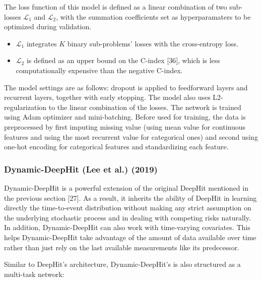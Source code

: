 \documentclass[
]{article}
\providecommand{\tightlist}{%
  \setlength{\itemsep}{0pt}\setlength{\parskip}{0pt}}
\begin{document}
The loss function of this model is defined as a linear combination of two sub-losses \(\mathcal{L}_1\) and \(\mathcal{L}_2\), with the summation coefficients set as hyperparamaters to be optimized during validation.
\vspace{-0.5cm}

\begin{itemize}
\tightlist
\item
  \(\mathcal{L}_1\) integrates \(K\) binary sub-problems' losses with the cross-entropy loss.
\item
  \(\mathcal{L}_2\) is defined as an upper bound on the C-index {[}36{]}, which is less computationally expensive than the negative C-index.
\end{itemize}

The model settings are as follows: dropout is applied to feedforward layers and recurrent layers, together with early stopping. The model also uses L2-regularization to the linear combination of the losses. The network is trained using Adam optimizer and mini-batching. Before used for training, the data is preprocessed by first imputing missing value (using mean value for continuous features and using the most recurrent value for categorical ones) and second using one-hot encoding for categorical features and standardizing each feature.

\hypertarget{dynamic-deephit-lee-et-al.-2019}{%
\subsubsection{Dynamic-DeepHit (Lee et al.) (2019)}\label{dynamic-deephit-lee-et-al.-2019}}

Dynamic-DeepHit is a powerful extension of the original DeepHit mentioned in the previous section {[}27{]}. As a result, it inherits the ability of DeepHit in learning directly the time-to-event distribution without making any strict assumption on the underlying stochastic process and in dealing with competing risks naturally. In addition, Dynamic-DeepHit can also work with time-varying covariates. This helps Dynamic-DeepHit take advantage of the amount of data available over time rather than just rely on the last available measurements like its predecessor.

Similar to DeepHit's architecture, Dynamic-DeepHit's is also structured as a multi-task network:
\vspace{-0.45cm}
\end{document}
